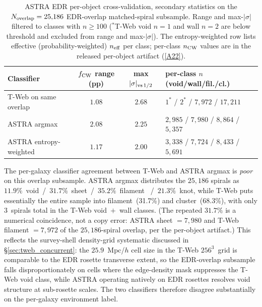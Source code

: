 \documentclass[aps,prd,twocolumn,superscriptaddress,showpacs,preprintnumbers,nofootinbib,longbibliography,floatfix]{revtex4-2}
\newcommand{\repoBase}{https://github.com/Hubify-Projects/bigbounce/blob/main}
\begin{document}
\begin{table}[!htb]
\caption{ASTRA EDR per-object cross-validation, secondary statistics on
the $N_{\rm overlap} = 25{,}186$ EDR-overlap matched-spiral subsample.
Range and max-$|\sigma|$ filtered to classes with $n \geq 100$
($^*$T-Web void $n=1$ and wall $n=2$ are below threshold and excluded
from range and max-$|\sigma|$). The entropy-weighted row lists
effective (probability-weighted) $n_{\rm eff}$ per class; per-class
$n_{\rm CW}$ values are in the released per-object artifact
(\href{\repoBase/pipelines/p5\_desi\_chirality/results/analysis\_astra\_per\_object/cw\_fraction\_by\_env\_astra.csv}{[A22]}).}
\label{tab:astra_headline}
\centering
\begin{ruledtabular}
\begin{tabular}{lccl}
Classifier & $f_{\rm CW}$ range (pp) & max $|\sigma|_{\rm vs\,1/2}$ &
per-class $n$ (void/wall/fil./cl.) \\
\hline
T-Web on same overlap         & $1.08$ & $2.68$ & $1^*$ / $2^*$ / $7{,}972$ / $17{,}211$ \\
ASTRA argmax                  & $2.08$ & $2.25$ & $2{,}985$ / $7{,}980$ / $8{,}864$ / $5{,}357$ \\
ASTRA entropy-weighted        & $1.17$ & $2.00$ & $3{,}338$ / $7{,}724$ / $8{,}433$ / $5{,}691$ \\
\end{tabular}
\end{ruledtabular}
\end{table}

The per-galaxy classifier agreement between T-Web and ASTRA argmax is
\emph{poor} on this overlap subsample. ASTRA argmax distributes the
$25{,}186$ spirals as $11.9\%$~void~/~$31.7\%$~sheet~/~$35.2\%$~filament
~/~$21.3\%$~knot, while T-Web puts essentially the entire sample into
filament~(31.7\%) and cluster~(68.3\%), with only $3$~spirals total in
the T-Web void~$+$~wall classes. (The repeated $31.7\%$ is a
numerical coincidence, not a copy error: ASTRA sheet $= 7{,}980$ and
T-Web filament $= 7{,}972$ of the $25{,}186$-spiral overlap, per the
per-object artifact.) This reflects the survey-shell
density-grid systematic discussed in
\S\ref{sec:tweb_concurrent}: the $25.9$~Mpc/$h$ cell size in the T-Web
$256^{3}$~grid is comparable to the EDR rosette transverse extent, so
the EDR-overlap subsample falls disproportionately on cells where the
edge-density mask suppresses the T-Web void class, while ASTRA
operating natively on EDR rosettes resolves void structure at
sub-rosette scales. The two classifiers therefore disagree
substantially on the per-galaxy environment label.
\end{document}
